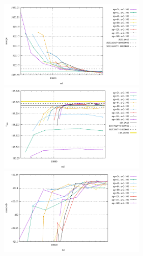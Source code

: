 \begin{center}
\includegraphics[width=7cm]{python_codes/fieldstone_93/results_exp4/max_p}\\
\includegraphics[width=7cm]{python_codes/fieldstone_93/results_exp4/vrms}
\includegraphics[width=7cm]{python_codes/fieldstone_93/results_exp4/max_vel}\\
\end{center}


